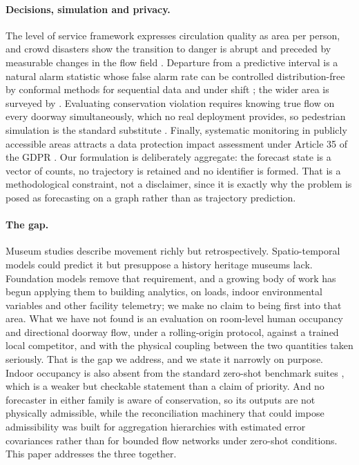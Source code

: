\documentclass[utf8]{FrontiersinHarvard}
\theoremstyle{plain}
\theoremstyle{definition}
\theoremstyle{remark}
\begin{document}
\paragraph{Decisions, simulation and privacy.}
The level of service framework \citep{fruin1971} expresses circulation quality as area per person, and crowd disasters show the transition to danger is abrupt and preceded by measurable changes in the flow field \citep{helbing2007crowd}. Departure from a predictive interval is a natural alarm statistic whose false alarm rate can be controlled distribution-free by conformal methods for sequential data \citep{stankeviciute2021conformal,xu2021enbpi} and under shift \citep{gibbs2021adaptive}; the wider area is surveyed by \citet{blazquez2021review}. Evaluating conservation violation requires knowing true flow on every doorway simultaneously, which no real deployment provides, so pedestrian simulation is the standard substitute \citep{helbing1995social,seitz2012osm,kleinmeier2019vadere,jupedsim}. Finally, systematic monitoring in publicly accessible areas attracts a data protection impact assessment under Article 35 of the GDPR \citep{gdpr}. Our formulation is deliberately aggregate: the forecast state is a vector of counts, no trajectory is retained and no identifier is formed. That is a methodological constraint, not a disclaimer, since it is exactly why the problem is posed as forecasting on a graph rather than as trajectory prediction.

\paragraph{The gap.}
Museum studies describe movement richly but retrospectively. Spatio-temporal models could predict it but presuppose a history heritage museums lack. Foundation models remove that requirement, and a growing body of work has begun applying them to building analytics, on loads, indoor environmental variables and other facility telemetry; we make no claim to being first into that area. What we have not found is an evaluation on room-level human occupancy and directional doorway flow, under a rolling-origin protocol, against a trained local competitor, and with the physical coupling between the two quantities taken seriously. That is the gap we address, and we state it narrowly on purpose. Indoor occupancy is also absent from the standard zero-shot benchmark suites \citep{aksu2024gifteval}, which is a weaker but checkable statement than a claim of priority. And no forecaster in either family is aware of conservation, so its outputs are not physically admissible, while the reconciliation machinery that could impose admissibility was built for aggregation hierarchies with estimated error covariances rather than for bounded flow networks under zero-shot conditions. This paper addresses the three together.
\end{document}
